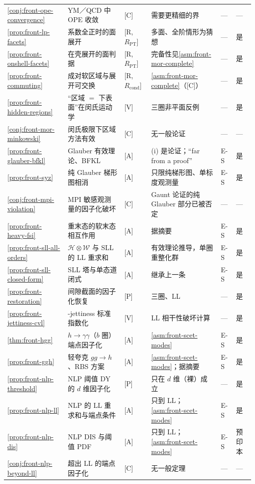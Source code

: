 \begin{table}[htbp]
\begin{tabularx}{\textwidth}{@{}p{1.75cm}>{\raggedright\arraybackslash}Xp{1.35cm}>{\raggedright\arraybackslash}p{3.6cm}p{0.75cm}p{0.95cm}@{}}
\cref{conj:front-ope-convergence} & YM／QCD 中 OPE 收敛 & [C] & 需要更精细的界 & — & — \\
\cref{prop:front-lp-facets} & 系数全正时的面展开 & [R, $R_{\mathrm{PT}}$] & 多面、全阶情形为猜想 & — & 是 \\
\cref{prop:front-onshell-facets} & 在壳展开的面判据 & [R, $R_{\mathrm{PT}}$] & 完备性见\cref{asm:front-mor-complete} & — & 是 \\
\cref{prop:front-commuting} & 成对软区域与展开可交换 & [R, $R_{\mathrm{cond}}$] & \cref{asm:front-mor-complete}（[C]） & — & 是 \\
\cref{prop:front-hidden-regions} & “区域 $=$ 下表面”在闵氏运动学 & [V] & 三圈非平面反例 & — & 是 \\
\cref{conj:front-mor-minkowski} & 闵氏极限下区域方法有效 & [C] & 无一般论证 & — & — \\
\cref{prop:front-glauber-bfkl} & Glauber 有效理论、BFKL & [A] & (i) 是论证；“far from a proof” & E-S & 是 \\
\cref{prop:front-syz} & 纯 Glauber 梯形图相消 & [A] & 只限纯梯形图、单标度观测量 & E-S & 是 \\
\cref{conj:front-mpi-violation} & MPI 敏感观测量的因子化破坏 & [C] & Gaunt 论证的纯 Glauber 部分已被否定 & — & — \\
\cref{prop:front-heavy-fsi} & 重末态的软末态相互作用 & [A] & 据摘要 & E-S & 是 \\
\cref{prop:front-sll-all-orders} & $\mathcal H\otimes\mathcal W$ 与 SLL 的 LL 重求和 & [A] & 有效理论推导，单圈重整化群 & E-S & 是 \\
\cref{prop:front-sll-closed-form} & SLL 塔与单态道闭式 & [A] & 继承上一条 & E-S & 是 \\
\cref{prop:front-restoration} & 间隙截面的因子化恢复 & [P] & 三圈、LL & — & 是 \\
\cref{prop:front-jettiness-cvl} & 1-jettiness 标准指数化 & [V] & LL 相干性破坏计算 & — & 是 \\
\cref{thm:front-hgg} & $h\to\gamma\gamma$（$b$ 圈）端点因子化 & [A] & \cref{asm:front-scet-modes} & E-S & 是 \\
\cref{prop:front-ggh} & 轻夸克 $gg\to h$、RBS 方案 & [A] & \cref{asm:front-scet-modes}；据摘要 & E-S & 是 \\
\cref{prop:front-nlp-threshold} & NLP 阈值 DY 的 $d$ 维因子化 & [P] & 只在 $d$ 维（裸）成立 & — & 是 \\
\cref{prop:front-nlp-ll} & NLP 的 LL 重求和与端点条件 & [A] & 只到 LL；\cref{asm:front-scet-modes} & E-S & 是 \\
\cref{prop:front-nlp-dis} & NLP DIS 与阈值 PDF & [A] & 只到 LL；\cref{asm:front-scet-modes} & E-S & 预印本 \\
\cref{conj:front-nlp-beyond-ll} & 超出 LL 的端点因子化 & [C] & 无一般定理 & — & — \\
\bottomrule
\end{tabularx}
\end{table}

